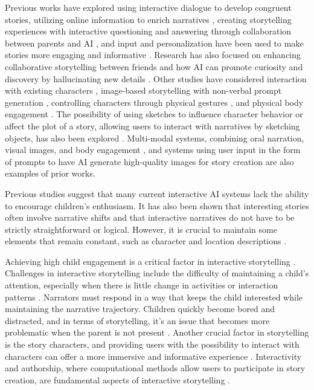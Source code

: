 \documentclass[submit,techrep,english]{ipsj}
\begin{document}
Previous works have explored using interactive dialogue to develop congruent stories, utilizing online information to enrich narratives \cite{13:abs-2011-04242}, creating storytelling experiences with interactive questioning and answering through collaboration between parents and AI \cite{12:ZhangXWYRWYWL22}, and input and personalization have been used to make stories more engaging and informative \cite{14:WangRCRMB22}. Research has also focused on enhancing collaborative storytelling between friends and how AI can promote curiosity and discovery by hallucinating new details \cite{8:ShakeriND21}. Other studies have considered interaction with existing characters \cite{10:ChopraVSS21}, image-based storytelling with non-verbal prompt generation \cite{4:HanC23}, controlling characters through physical gestures \cite{2:LiuLWCS12}, and physical body engagement \cite{3:ZhaoB23}. The possibility of using sketches to influence character behavior or affect the plot of a story, allowing users to interact with narratives by sketching objects, has also been explored \cite{11:LimaGV20}. Multi-modal systems, combining oral narration, visual images, and body engagement \cite{3:ZhaoB23}, and systems using user input in the form of prompts to have AI generate high-quality images for story creation \cite{4:HanC23} are also examples of prior works.

Previous studies suggest that many current interactive AI systems lack the ability to encourage children's enthusiasm. It has also been shown that interesting stories often involve narrative shifts and that interactive narratives do not have to be strictly straightforward or logical. However, it is crucial to maintain some elements that remain constant, such as character and location descriptions \cite{13:abs-2011-04242}.

Achieving high child engagement is a critical factor in interactive storytelling \cite{12:ZhangXWYRWYWL22}. Challenges in interactive storytelling include the difficulty of maintaining a child's attention, especially when there is little change in activities or interaction patterns \cite{13:abs-2011-04242}. Narrators must respond in a way that keeps the child interested while maintaining the narrative trajectory. Children quickly become bored and distracted, and in terms of storytelling, it's an issue that becomes more problematic when the parent is not present \cite{12:ZhangXWYRWYWL22}. Another crucial factor in storytelling is the story characters, and providing users with the possibility to interact with characters can offer a more immersive and informative experience \cite{10:ChopraVSS21}. Interactivity and authorship, where computational methods allow users to participate in story creation, are fundamental aspects of interactive storytelling \cite{11:LimaGV20}.
\end{document}
